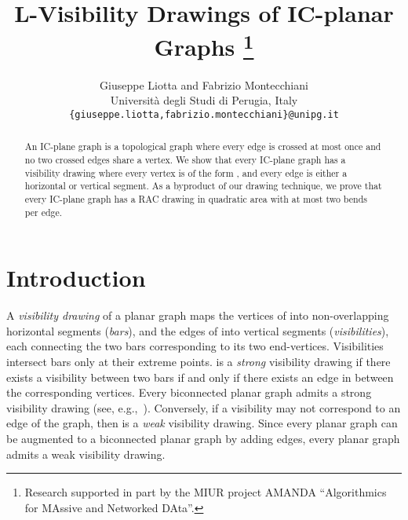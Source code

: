 \documentclass[a4paper]{article}
\newcommand{\shapes}{\xspace}
\begin{document}
\title{L-Visibility Drawings of IC-planar Graphs
\thanks{Research supported in part by the MIUR project AMANDA ``Algorithmics for MAssive and Networked DAta''.}}
    
\author{Giuseppe Liotta and Fabrizio Montecchiani\\Universit{\`a} degli Studi di Perugia, Italy\\ \texttt{\small\{giuseppe.liotta,fabrizio.montecchiani\}@unipg.it}} 

\date{}

\maketitle

\begin{abstract}
An IC-plane graph is a topological graph where every edge is crossed at most once and no two crossed edges share a vertex. We show that every IC-plane graph has a visibility drawing where every vertex is of the form \shapes, and every edge is either a horizontal or vertical segment. As a byproduct of our drawing technique, we prove that every IC-plane graph has a RAC drawing in quadratic area with at most two bends per edge.
\end{abstract}






\section{Introduction}

A \emph{visibility drawing}  of a planar graph  maps the vertices of  into non-overlapping horizontal segments (\emph{bars}), and the edges of  into  vertical segments (\emph{visibilities}), each connecting the two bars corresponding to its two end-vertices. Visibilities intersect bars only at their extreme points.  is a \emph{strong} visibility drawing if there exists a visibility between two bars if and only if there exists an edge in  between the corresponding vertices. Every biconnected planar graph admits a strong visibility drawing (see, e.g.,~\cite{TamassiaTollis86}). Conversely, if a visibility may not correspond to an edge of the graph, then  is a {\em weak} visibility drawing. Since every planar graph can be augmented to a biconnected planar graph by adding edges, every planar graph admits a weak visibility drawing. 
\end{document}
